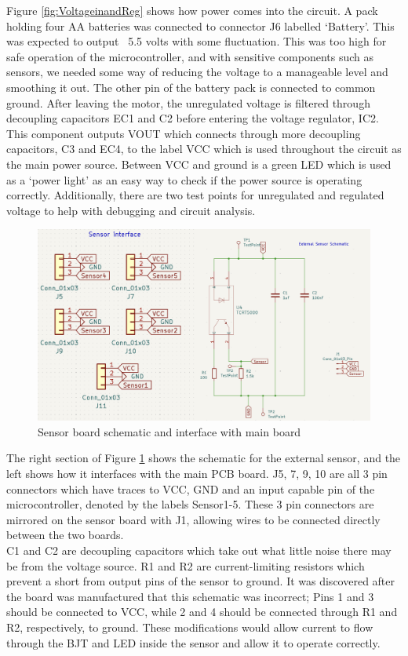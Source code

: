 \documentclass{article}
\begin{document}
Figure \ref{fig:VoltageinandReg} shows how power comes into the circuit. A pack holding four AA batteries was connected to connector J6 labelled ‘Battery’. This was expected to output ~5.5 volts with some fluctuation. This was too high for safe operation of the microcontroller, and with sensitive components such as sensors, we needed some way of reducing the voltage to a manageable level and smoothing it out. The other pin of the battery pack is connected to common ground. After leaving the motor, the unregulated voltage is filtered through decoupling capacitors EC1 and C2 before entering the voltage regulator, IC2. This component outputs VOUT which connects through more decoupling capacitors, C3 and EC4, to the label VCC which is used throughout the circuit as the main power source. Between VCC and ground is a green LED which is used as a ‘power light’ as an easy way to check if the power source is operating correctly. Additionally, there are two test points for unregulated and regulated voltage to help with debugging and circuit analysis. 
\\


\begin{figure}[H]
    \centering
    \includegraphics[width=0.7\linewidth]{REPORT/Sensor.png}
    \caption{Sensor board schematic and interface with main board}
    \label{fig:SensorSchem}
\end{figure}

The right section of Figure \ref{fig:SensorSchem} shows the schematic for the external sensor, and the left shows how it interfaces with the main PCB board. J5, 7, 9, 10 are all 3 pin connectors which have traces to VCC, GND and an input capable pin of the microcontroller, denoted by the labels Sensor1-5. These 3 pin connectors are mirrored on the sensor board with J1, allowing wires to be connected directly between the two boards. 
\\

C1 and C2 are decoupling capacitors which take out what little noise there may be from the voltage source. R1 and R2 are current-limiting resistors which prevent a short from output pins of the sensor to ground. It was discovered after the board was manufactured that this schematic was incorrect; Pins 1 and 3 should be connected to VCC, while 2 and 4 should be connected through R1 and R2, respectively, to ground. These modifications would allow current to flow through the BJT and LED inside the sensor and allow it to operate correctly. 
\\
\end{document}
